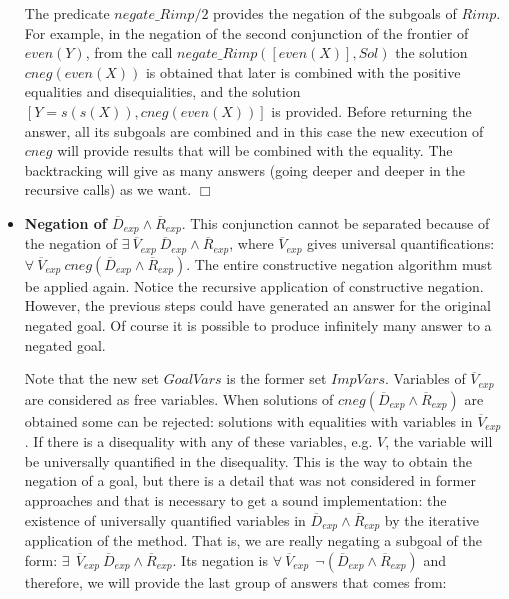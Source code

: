 \documentclass{tlp}
\newcommand{\implementation}[1]{\noindent{\sc Implementation details:}
  #1 $\Box$}
\begin{document}
\begin{itemize}
\implementation{
The predicate $negate\_Rimp/2$ provides the
negation of the subgoals of $Rimp$. For example, in the negation of the second
conjunction of the frontier of $even(Y)$, from the call
$negate\_Rimp([even(X)],Sol)$ the solution $cneg(even(X))$ is obtained
that later is combined with the positive equalities and disequialities, and the
solution $[Y=s(s(X)),cneg(even(X))]$ is provided. Before returning the answer,
all its subgoals are combined and in this case the new execution of $cneg$
will provide results that will be combined with the equality. The backtracking
will give as many answers (going deeper and deeper in the recursive calls)
as we want.
}

           \item {\bf Negation of $\overline{D}_{exp} \wedge
           \overline{R}_{exp}$}. This conjunction cannot be separated
           because of the negation of $ \exists~ \overline{V}_{exp}~
           \overline{D}_{exp} \wedge \overline{R}_{exp}$, where
           $\overline{V}_{exp}$ gives universal quantifications:\\
           $\forall~ \overline{V}_{exp}~ cneg(\overline{D}_{exp}
           \wedge \overline{R}_{exp})$. The entire constructive
           negation algorithm must be applied again. Notice the
           recursive application of constructive negation. However,
           the previous steps could have generated an answer for the
           original negated goal. Of course it is possible to produce
           infinitely many answer to a negated goal.

           Note that the new set $GoalVars$ is the former set
           $ImpVars$. Variables of $\overline{V}_{exp}$ are considered
           as free variables. When solutions of
           $cneg(\overline{D}_{exp} \wedge \overline{R}_{exp})$ are
           obtained some can be rejected: solutions with equalities
           with variables in $\overline{V}_{exp}$. If there is a
           disequality with any of these variables, e.g. $V$, the
           variable will be universally quantified in the disequality.
           This is the way to obtain the negation of a goal, but there
           is a detail that was not considered in former approaches
           and that is necessary to get a sound implementation: the
           existence of universally quantified variables in
           $\overline{D}_{exp} \wedge \overline{R}_{exp}$ by the
           iterative application of the method. That is, we are really
           negating a subgoal of the form: $ \exists~~
           \overline{V}_{exp}~ \overline{D}_{exp} \wedge
           \overline{R}_{exp}$. Its negation is $\forall~
           \overline{V}_{exp}~~ \neg(\overline{D}_{exp} \wedge
           \overline{R}_{exp})$ and therefore, we will provide the
           last group of answers that comes from:


\end{itemize}
\end{document}
